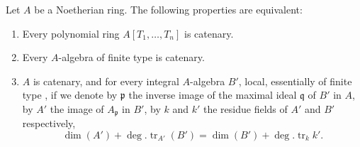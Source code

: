 \begin{proposition}[5.6.1]
\label{IV.5.6.1}
Let $A$ be a Noetherian ring.
The following properties are equivalent:
\begin{enumerate}[label=\emph{\alph*)}]
  \item Every polynomial ring $A[T_1,\ldots,T_n]$ is catenary.
  \item Every $A$-algebra of finite type is catenary.
  \item $A$ is catenary, and for every integral $A$-algebra $B'$, local, essentially of finite type , if we denote by $\mathfrak{p}$ the inverse image of the maximal ideal $\mathfrak{q}$ of $B'$ in $A$, by $A'$ the image of $A_\mathfrak{p}$ in $B'$, by $k$ and $k'$ the residue fields of $A'$ and $B'$ respectively,
\[
\tag{5.6.1.1}\label{IV.5.6.1.1}
  \dim(A') + \deg.\operatorname{tr}_{A'}(B') = \dim(B') + \deg.\operatorname{tr}_k k'.
\]
\end{enumerate}
\end{proposition}

